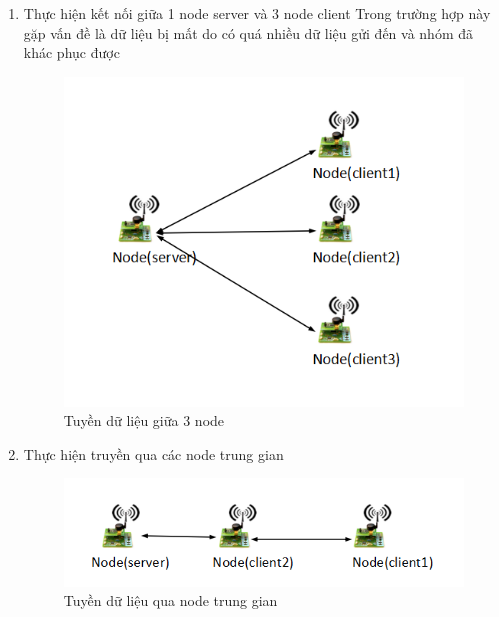\begin{enumerate}
\begin{center}
\begin{figure}[htp]
    \label{refhinh1}
    \end{figure}
\end{center}
    \item Thực hiện kết nối giữa 1 node server và 3 node client
Trong trường hợp này gặp vấn đề là dữ liệu bị mất do có quá nhiều dữ liệu gửi đến và nhóm đã khác phục được
\begin{center}
    \begin{figure}[htp]
    \begin{center}
     \includegraphics[scale=.8]{image6/4node.png}
    \end{center}
    \caption{Tuyền dữ liệu giữa 3 node}
    \label{refhinh1}
    \end{figure}
\end{center}
\newpage
    \item Thực hiện truyền qua các node trung gian
\begin{center}
    \begin{figure}[htp]
    \begin{center}
     \includegraphics[scale=.8]{image6/trunggian.png}
    \end{center}
    \caption{Tuyền dữ liệu qua node trung gian}
    \label{refhinh1}
    \end{figure}
\end{center}
\end{enumerate}
